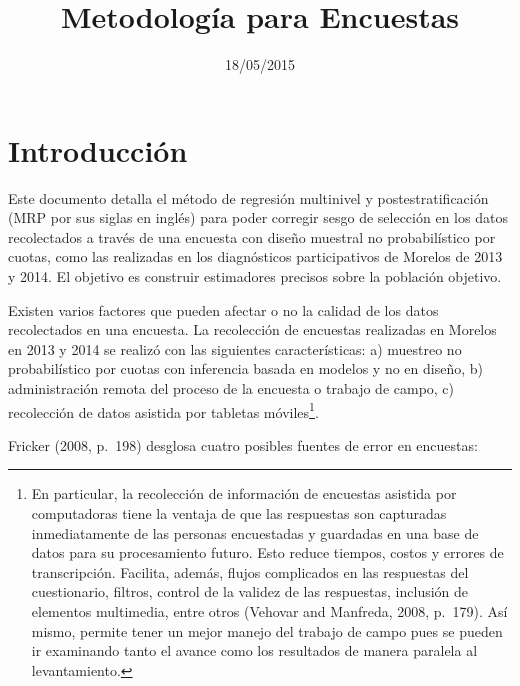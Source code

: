 \documentclass[]{article}
\title{Metodología para Encuestas}
\author{}
\date{18/05/2015}
\let\rmarkdownfootnote\footnote%
\def\footnote{\protect\rmarkdownfootnote}
\begin{document}
\maketitle


{
\hypersetup{linkcolor=black}
\setcounter{tocdepth}{2}
\tableofcontents
}
\pagebreak

\section{Introducción}\label{introduccion}

Este documento detalla el método de regresión multinivel y
postestratificación (MRP por sus siglas en inglés) para poder corregir
sesgo de selección en los datos recolectados a través de una encuesta
con diseño muestral no probabilístico por cuotas, como las realizadas en
los diagnósticos participativos de Morelos de 2013 y 2014. El objetivo
es construir estimadores precisos sobre la población objetivo.

Existen varios factores que pueden afectar o no la calidad de los datos
recolectados en una encuesta. La recolección de encuestas realizadas en
Morelos en 2013 y 2014 se realizó con las siguientes características: a)
muestreo no probabilístico por cuotas con inferencia basada en modelos y
no en diseño, b) administración remota del proceso de la encuesta o
trabajo de campo, c) recolección de datos asistida por tabletas
móviles\footnote{En particular, la recolección de información de
  encuestas asistida por computadoras tiene la ventaja de que las
  respuestas son capturadas inmediatamente de las personas encuestadas y
  guardadas en una base de datos para su procesamiento futuro. Esto
  reduce tiempos, costos y errores de transcripción. Facilita, además,
  flujos complicados en las respuestas del cuestionario, filtros,
  control de la validez de las respuestas, inclusión de elementos
  multimedia, entre otros (Vehovar and Manfreda, 2008, p.~179). Así
  mismo, permite tener un mejor manejo del trabajo de campo pues se
  pueden ir examinando tanto el avance como los resultados de manera
  paralela al levantamiento.}.

Fricker (2008, p.~198) desglosa cuatro posibles fuentes de error en
encuestas:
\end{document}
